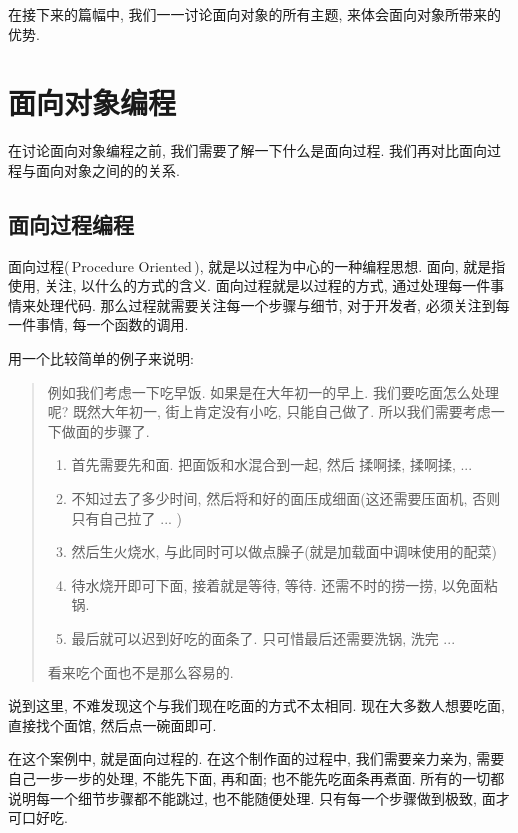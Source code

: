 在接下来的篇幅中, 我们一一讨论面向对象的所有主题, 来体会面向对象所带来的优势.





\section{面向对象编程}

在讨论面向对象编程之前, 我们需要了解一下什么是面向过程. 我们再对比面向过程与面向对象之间的的关系.


\subsection{面向过程编程}

面向过程(\,Procedure Oriented\,), 就是以过程为中心的一种编程思想. 面向, 就是指使用, 关注, 以什么的方式的含义. 
面向过程就是以过程的方式, 通过处理每一件事情来处理代码. 那么过程就需要关注每一个步骤与细节, 对于开发者,
必须关注到每一件事情, 每一个函数的调用. 

用一个比较简单的例子来说明:
%
\begin{quote}
例如我们考虑一下吃早饭. 如果是在大年初一的早上. 我们要吃面怎么处理呢? 既然大年初一, 街上肯定没有小吃, 
只能自己做了. 所以我们需要考虑一下做面的步骤了.
%
\begin{enumerate}
\item 首先需要先和面. 把面饭和水混合到一起, 然后 揉啊揉, 揉啊揉, ...
\item 不知过去了多少时间, 然后将和好的面压成细面(这还需要压面机, 否则只有自己拉了 ... )
\item 然后生火烧水, 与此同时可以做点臊子(就是加载面中调味使用的配菜)
\item 待水烧开即可下面, 接着就是等待, 等待. 还需不时的捞一捞, 以免面粘锅.
\item 最后就可以迟到好吃的面条了. 只可惜最后还需要洗锅, 洗完 ...
\end{enumerate}
%
看来吃个面也不是那么容易的.
\end{quote}
%
说到这里, 不难发现这个与我们现在吃面的方式不太相同. 现在大多数人想要吃面, 直接找个面馆, 然后点一碗面即可.

在这个案例中, 就是面向过程的. 在这个制作面的过程中, 我们需要亲力亲为, 需要自己一步一步的处理, 不能先下面, 再和面;
也不能先吃面条再煮面. 所有的一切都说明每一个细节步骤都不能跳过, 也不能随便处理. 只有每一个步骤做到极致, 面才可口好吃.

